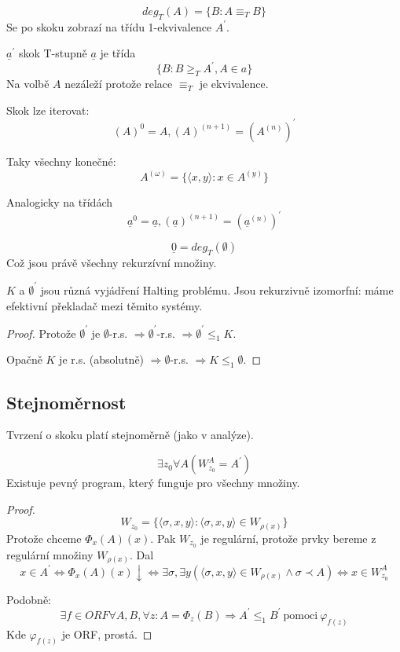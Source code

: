 \begin{note}
	\[ deg_T(A) = \{ B: A \equiv_T B \} \]
	Se po skoku zobrazí na třídu 1-ekvivalence $A^{\prime}$.

\end{note}

\begin{definition}\label{jump_T}
	$\underline{a}^{\prime}$ skok T-stupně $\underline{a}$ je třída
	\[ \{ B: B \geq_T A^{\prime}, A \in a \} \]
	Na volbě $A$ nezáleží protože relace $\equiv_T$ je ekvivalence.
\end{definition}

\begin{note}
	Skok lze iterovat:
	\[ (A)^0 = A, (A)^{(n + 1)} = (A^{(n)})^{\prime} \]

	Taky všechny konečné:
	\[ A^{(\omega)} = \{ \langle x, y \rangle: x \in A^{(y)} \} \]

	Analogicky na třídách
	\[ \underline{a}^0 = \underline{a}, (\underline{a})^{(n + 1)} = (\underline{a}^{(n)})^{\prime} \]
\end{note}

\begin{observation}
	\[ \underline{0} = deg_T(\emptyset) \]
	Což jsou právě všechny rekurzívní množiny.
\end{observation}

\begin{lemma}
	$K$ a $\emptyset^{\prime}$ jsou různá vyjádření Halting problému.
	Jsou rekurzivně izomorfní: máme efektivní překladač mezi těmito systémy.
\end{lemma}
\begin{proof}
	Protože $\emptyset^{\prime}$ je $\emptyset$-r.s. $\Rightarrow \emptyset^{\prime}$-r.s. $\Rightarrow \emptyset^{\prime}  \leq_1 K $.

	Opačně $K$ je r.s. (absolutně) $\Rightarrow \emptyset$-r.s. $\Rightarrow K \leq_1 \emptyset$.
\end{proof}

\subsection{Stejnoměrnost}
Tvrzení o skoku platí stejnoměrně (jako v analýze).

\begin{theorem}
	\[ \exists z_0 \forall A (W_{z_0}^A = A^{\prime}) \]
	Existuje pevný program, který funguje pro všechny množiny.
\end{theorem}
\begin{proof}
	\[ W_{z_0} = \{ \langle \sigma, x, y \rangle: \langle \sigma, x, y \rangle \in W_{\rho(x)} \} \]
	Protože chceme $\Phi_x(A)(x)$.
	Pak $W_{z_0}$ je regulární, protože prvky bereme z regulární množiny $W_{\rho(x)}$.
	Dal
	\[ x \in A^{\prime} \iff \Phi_x(A)(x) \downarrow \iff \exists \sigma, \exists y(\langle \sigma, x, y \rangle \in W_{\rho(x)} \land \sigma \prec A) \iff x \in W_{z_0}^A \]

	Podobně: \[ \exists f \in ORF \forall A, B, \forall z: A = \Phi_z(B) \Rightarrow A^{\prime} \leq_1 B^{\prime}\ \text{pomoci}\ \varphi_{f(z)} \]
	Kde $\varphi_{f(z)}$ je ORF, prostá.
\end{proof}
